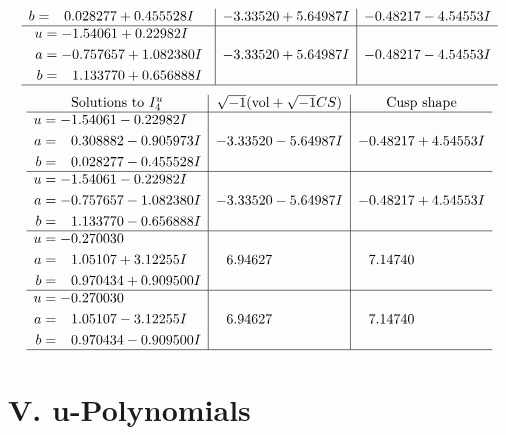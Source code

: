 \documentclass[1p]{elsarticle_modified}
\theoremstyle{definition}
\newcommand{\I}{\sqrt{-1}}
\begin{document}
$$\begin{array}{c|c|c}
\begin{aligned}
b &= \phantom{-}0.028277 + 0.455528 I\end{aligned}
 & -3.33520 + 5.64987 I & -0.48217 - 4.54553 I \\ \hline\begin{aligned}
u &= -1.54061 + 0.22982 I \\
a &= -0.757657 + 1.082380 I \\
b &= \phantom{-}1.133770 + 0.656888 I\end{aligned}
 & -3.33520 + 5.64987 I & -0.48217 - 4.54553 I\\
 \hline 
 \end{array}$$\newpage$$\begin{array}{c|c|c}  
\text{Solutions to }I^u_{4}& \I (\text{vol} + \sqrt{-1}CS) & \text{Cusp shape}\\
 \hline 
\begin{aligned}
u &= -1.54061 - 0.22982 I \\
a &= \phantom{-}0.308882 - 0.905973 I \\
b &= \phantom{-}0.028277 - 0.455528 I\end{aligned}
 & -3.33520 - 5.64987 I & -0.48217 + 4.54553 I \\ \hline\begin{aligned}
u &= -1.54061 - 0.22982 I \\
a &= -0.757657 - 1.082380 I \\
b &= \phantom{-}1.133770 - 0.656888 I\end{aligned}
 & -3.33520 - 5.64987 I & -0.48217 + 4.54553 I \\ \hline\begin{aligned}
u &= -0.270030\phantom{ +0.000000I} \\
a &= \phantom{-}1.05107 + 3.12255 I \\
b &= \phantom{-}0.970434 + 0.909500 I\end{aligned}
 & \phantom{-}6.94627\phantom{ +0.000000I} & \phantom{-}7.14740\phantom{ +0.000000I} \\ \hline\begin{aligned}
u &= -0.270030\phantom{ +0.000000I} \\
a &= \phantom{-}1.05107 - 3.12255 I \\
b &= \phantom{-}0.970434 - 0.909500 I\end{aligned}
 & \phantom{-}6.94627\phantom{ +0.000000I} & \phantom{-}7.14740\phantom{ +0.000000I}\\
 \hline 
 \end{array}$$\newpage
\newpage\renewcommand{\arraystretch}{1}
\centering \section*{ V. u-Polynomials}
\end{document}
